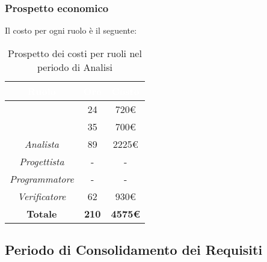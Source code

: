 \subsubsection{Prospetto economico}
Il costo per ogni ruolo è il seguente:
\begin{table}[H]
	\begin{center}
		\begin{tabular}{ |c c c| }
		\rowcolor{darkblue} 
		\textcolor{white}{\textbf{Ruolo}} & \textcolor{white}{\textbf{Ore}} & \textcolor{white}{\textbf{Costo}} \\ \hline
		\textit{\Responsabile} 	& 24 	& 720€ \\ \hline
		\textit{\Amministratore} 	& 35 	& 700€ \\ \hline
		\textit{Analista} 		& 89 	& 2225€ \\ \hline
		\textit{Progettista} 	& - 	& - \\ \hline
		\textit{Programmatore}  	& - 	& - \\ \hline
		\textit{Verificatore} 	& 62 	& 930€ \\ \hline
		\textbf{Totale} 		& \textbf{210} & \textbf{4575€} \\ \hline
		\end{tabular}
	\caption{ Prospetto dei costi per ruoli nel periodo di Analisi}
	\end{center}
\end{table}

\subsection{Periodo di Consolidamento dei Requisiti}

